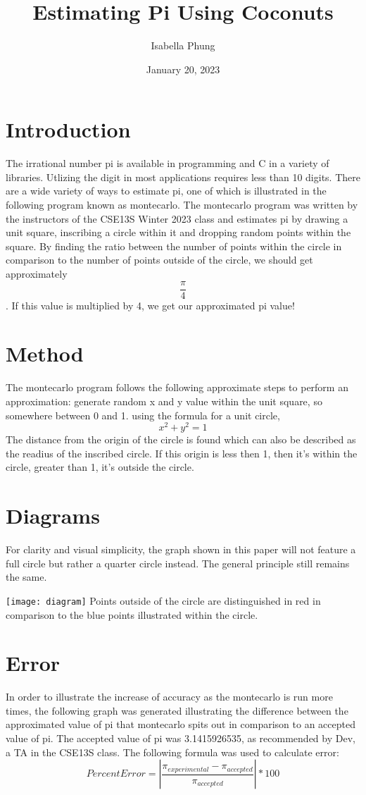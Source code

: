 \documentclass{article}
\title{Estimating Pi Using Coconuts}
\author{Isabella Phung}
\date{January 20, 2023}
\begin{document}
\maketitle

\section{Introduction}

The irrational number pi is available in programming and C in a variety of libraries. Utlizing the digit in most applications requires less than 10 digits. There are a wide variety of ways to estimate pi, one of which is illustrated in the following program known as monte\textunderscore carlo.
The monte\textunderscore carlo program was written by the instructors of the CSE13S Winter 2023 class and estimates pi by drawing a unit square, inscribing a circle within it and dropping random points within the square. By finding the ratio between the number of points within the circle in comparison to the number of points outside of the circle, we should get approximately $$\frac{\pi}{4}$$. If this value is multiplied by 4, we get our approximated pi value!

\section{Method}
The monte\textunderscore carlo program follows the following approximate steps to perform an approximation:
generate random x and y value within the unit square, so somewhere between 0 and 1.
using the formula for a unit circle,
$$x^2 + y^2 = 1$$
The distance from the origin of the circle is found which can also be described as the readius of the inscribed circle.
If this origin is less then 1, then it's within the circle, greater than 1, it's outside the circle.

\section{Diagrams}
For clarity and visual simplicity, the graph shown in this paper will not feature a full circle but rather a quarter circle instead. The general principle still remains the same.

\texttt{[image: diagram]}
Points outside of the circle are distinguished in red in comparison to the blue points illustrated within the circle.

\section{Error}
In order to illustrate the increase of accuracy as the monte\textunderscore carlo is run more times, the following graph was generated illustrating the difference between the approximated value of pi that monte\textunderscore carlo spits out in comparison to an accepted value of pi.
The accepted value of pi was 3.1415926535, as recommended by Dev, a TA in the CSE13S class.
The following formula was used to calculate error:
$$Percent Error = |\frac{\pi_{experimental} - \pi_{accepted}}{\pi_{accepted}}|*100$$
\end{document}
